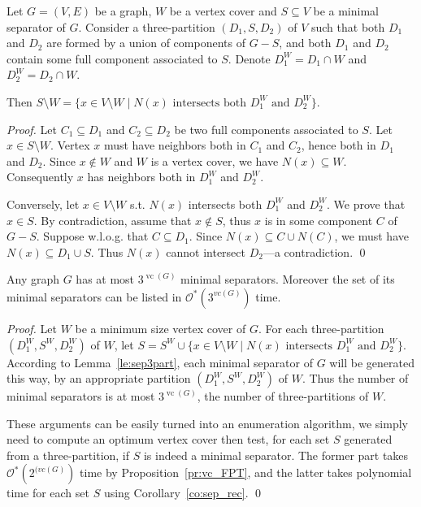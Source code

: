 \documentclass{llncs}
\newcommand{\cO}{\mathcal{O}}
\newcommand{\vc}{\operatorname{vc}}
\newcommand{\sm}{\setminus}
\begin{document}
\begin{lemma}\label{le:sep3part}
Let $G =(V,E)$ be a graph, $W$ be a vertex cover and $S \subseteq V$ be a minimal separator of $G$. Consider a three-partition $(D_1,S,D_2)$ of $V$ such that 
both $D_1$ and $D_2$ are formed by a union of components of $G - S$, and both $D_1$ and $D_2$ contain some full component associated to $S$.
Denote $D_1^W = D_1 \cap W$ and $D_2^W = D_2 \cap W$. 

Then $S \sm W  = \{ x \in V \setminus W \mid N(x) \text{~intersects both~} D_1^W \text{~and~} D_2^W\}$.
\end{lemma}
\begin{proof}
Let $C_1 \subseteq D_1$ and $C_2 \subseteq D_2$ be two full components associated to $S$.
Let $x \in S \setminus W$. Vertex $x$ must have neighbors both in $C_1$ and $C_2$, hence both in $D_1$ and $D_2$. Since $x \not\in W$ and $W$ is a vertex cover, we have $N(x) \subseteq W$. Consequently $x$ has neighbors both in  $D_1^W$ and $D_2^W$.

Conversely, let $x \in V \setminus W$ s.t. $N(x)$ intersects both $D_1^W$ and $D_2^W$. We prove that $x \in S$. By contradiction, assume that $x \not\in S$, thus $x$ is in some component $C$ of $G - S$. Suppose w.l.o.g. that $C \subseteq D_1$. Since $N(x) \subseteq C \cup N(C)$, we must have $N(x) \subseteq D_1 \cup S$. Thus $N(x)$ cannot intersect $D_2$---a contradiction.
\qed
\end{proof}

\begin{theorem}\label{th:sep_vc}
Any graph $G$ has at most $3^{\vc(G)}$ minimal separators. Moreover the set of its minimal separators can be listed in $\cO^*(3^{vc(G)})$ time.
\end{theorem}
\begin{proof}
Let $W$ be a minimum size vertex cover of $G$. For each three-partition $(D_1^W, S^W, D_2^W)$ of $W$, let $S = S^W \cup \{ x \in V \setminus W \mid N(x) \text{~intersects~} D_1^W \text{~and~} D_2^W\}$. According to Lemma~\ref{le:sep3part}, each minimal separator of $G$ will be generated this way, by an appropriate partition $(D_1^W, S^W, D_2^W)$ of $W$. Thus the number of minimal separators is at most $3^{\vc(G)}$, the number of three-partitions of $W$.

These arguments can be easily turned into an enumeration algorithm, we simply need to compute an optimum vertex cover then test, for each set $S$ generated from a three-partition, if $S$ is indeed a minimal separator. The former part takes $\cO^*(2^{(vc(G)})$ time by Proposition~\ref{pr:vc_FPT}, and the latter takes polynomial time for each set $S$ using Corollary~\ref{co:sep_rec}.
\qed
\end{proof}
 
\end{document}
